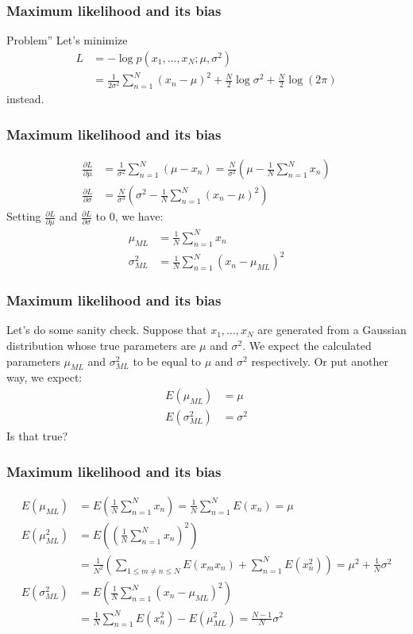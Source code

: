 \documentclass{beamer}
\begin{document}
\begin{frame}
    \frametitle{Maximum likelihood and its bias}
    \begin{block}{Problem''}
        Let's minimize
        \begin{align*}
            L&=-\log{}p(x_{1},\hdots,x_{N};\mu,\sigma^{2}) \\
            &=\frac{1}{2\sigma^{2}}\sum_{n=1}^{N}(x_{n}-\mu)^{2}+\frac{N}{2}\log\sigma^{2}+\frac{N}{2}\log(2\pi)
        \end{align*}
        instead.
    \end{block}
\end{frame}

\begin{frame}
    \frametitle{Maximum likelihood and its bias}
    \begin{align*}
        \frac{\partial{}L}{\partial\mu}&=\frac{1}{\sigma^{2}}\sum_{n=1}^{N}(\mu-x_{n})=\frac{N}{\sigma^{2}}(\mu-\frac{1}{N}\sum_{n=1}^{N}x_{n}) \\
        \frac{\partial{}L}{\partial\sigma}&=\frac{N}{\sigma^{3}}(\sigma^{2}-\frac{1}{N}\sum_{n=1}^{N}(x_{n}-\mu)^{2})
    \end{align*}
    Setting $\frac{\partial{}L}{\partial\mu}$ and $\frac{\partial{}L}{\partial\sigma}$ to $0$, we have:
    \begin{align*}
        \mu_{ML}&=\frac{1}{N}\sum_{n=1}^{N}x_{n} \\
        \sigma^{2}_{ML}&=\frac{1}{N}\sum_{n=1}^{N}(x_{n}-\mu_{ML})^{2}
    \end{align*}
\end{frame}

\begin{frame}
    \frametitle{Maximum likelihood and its bias}
    Let's do some sanity check. Suppose that $x_{1},\hdots,x_{N}$ are generated from a Gaussian distribution whose true parameters are $\mu$ and $\sigma^{2}$. We expect the calculated parameters $\mu_{ML}$ and $\sigma^{2}_{ML}$ to be equal to $\mu$ and $\sigma^{2}$
    respectively. Or put another way, we expect:
    \begin{align*}
        E(\mu_{ML})&=\mu \\
        E(\sigma^{2}_{ML})&=\sigma^{2}
    \end{align*}
    Is that true?
\end{frame}

\begin{frame}
    \frametitle{Maximum likelihood and its bias}
    \begin{align*}
        E(\mu_{ML})&=E(\frac{1}{N}\sum_{n=1}^{N}x_{n})=\frac{1}{N}\sum_{n=1}^{N}E(x_{n})=\mu \\
        E(\mu_{ML}^{2})&=E((\frac{1}{N}\sum_{n=1}^{N}x_{n})^{2}) \\
        &=\frac{1}{N^{2}}(\sum_{1\le{}m\ne{}n\le{}N}E(x_{m}x_{n})+\sum_{n=1}^{N}E(x_{n}^{2}))=\mu^{2}+\frac{1}{N}\sigma^{2} \\
        E(\sigma^{2}_{ML})&=E(\frac{1}{N}\sum_{n=1}^{N}(x_{n}-\mu_{ML})^{2}) \\
        &=\frac{1}{N}\sum_{n=1}^{N}E(x_{n}^{2})-E(\mu_{ML}^{2})=\frac{N-1}{N}\sigma^{2}
    \end{align*}
\end{frame}
\end{document}
